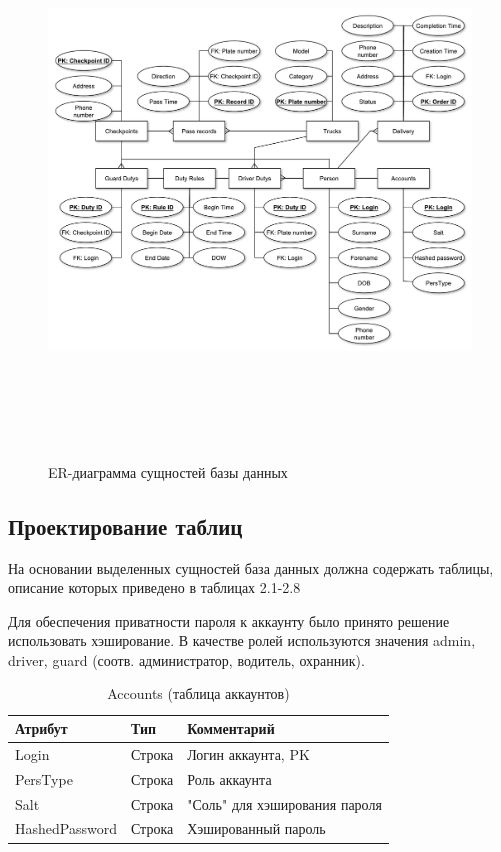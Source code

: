 \begin{figure}[ph!]
	\begin{center}
		{\includegraphics[height=14cm, width = 15cm]{schemes/er_db.pdf}}
		\caption{ER-диаграмма сущностей базы данных}
		\label{er_db}
	\end{center}
\end{figure}

\subsection{Проектирование таблиц}
На основании выделенных сущностей база данных должна содержать таблицы, описание которых приведено в таблицах 2.1-2.8

Для обеспечения приватности пароля к аккаунту было принято решение использовать хэширование. В качестве ролей используются значения admin, driver, guard (соотв. администратор, водитель, охранник).
\begin{table}[h] 
	\begin{center}
	\caption{Accounts (таблица аккаунтов)}
	\label{acc_table}
	\begin{tabular}{| p{3.8cm} | p{3cm} | p{7.2cm} |}
		\hline
		\textbf{Атрибут}		&	\textbf{Тип}		& \textbf{Комментарий} \\
		\hline
		Login 		&	Строка		&	Логин аккаунта, PK \\ \hline
		PersType 	&	Строка 		&	Роль аккаунта \\ \hline
		Salt 		&	Строка		&	"Соль" для хэширования пароля \\ \hline
		HashedPassword & Строка		&	Хэшированный пароль \\ \hline
	\end{tabular}
	\end{center}
\end{table}


